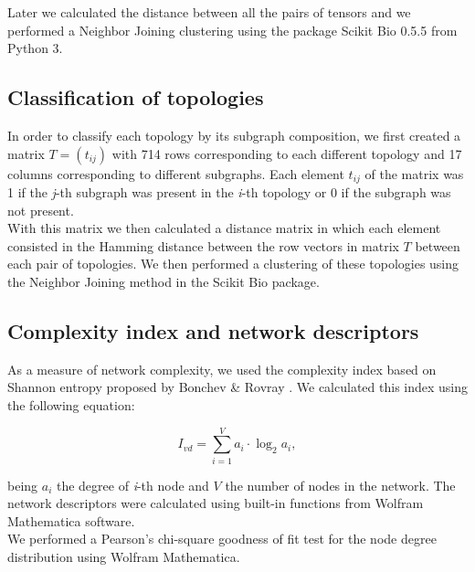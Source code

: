 \documentclass[10pt,letterpaper]{article}
\begin{document}
Later we calculated the distance between all the pairs of tensors and we 
performed a Neighbor Joining clustering using the package Scikit Bio 0.5.5 from 
Python 3.

\subsection*{Classification of topologies}

In order to classify each topology by its subgraph composition, we first created
a matrix  $T = (t_{ij})$ with 714 rows corresponding to each different topology 
and 17 columns corresponding to different subgraphs. Each element $t_{ij}$ of 
the matrix was 1 if the \emph{j}-th subgraph was present in the \emph{i}-th 
topology or 0 if the subgraph was not present.\\

With this matrix we then calculated a distance matrix in which each element 
consisted in the Hamming distance between the row vectors in matrix $T$ between 
each pair of topologies. We then performed a clustering of these topologies 
using the Neighbor Joining method in the Scikit Bio package.

\subsection*{Complexity index and network descriptors}

As a measure of network complexity, we used the complexity index based on 
Shannon entropy proposed by Bonchev \& Rovray \cite{D.2005}. We calculated this 
index using the following equation:

\begin{equation}
 I_{vd} = \sum_{i=1}^V a_i \cdot \log_{2} a_i,
\end{equation}

being $a_i$ the degree of \emph{i}-th node and $V$ the number of nodes in the 
network. The network descriptors were calculated using built-in functions from 
Wolfram Mathematica software.\\

We performed a Pearson’s chi-square goodness of fit test for the node degree 
distribution using Wolfram Mathematica.


\end{document}

